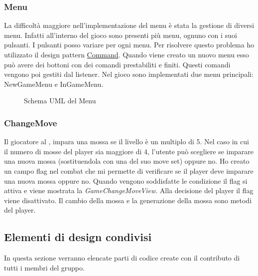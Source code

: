 \documentclass[a4paper,12pt]{report}
\begin{document}
\subsubsection{Menu}
La difficoltà maggiore nell'implementazione del menu è stata la gestione di diversi menu. Infatti all'interno del gioco sono presenti più menu, ognuno con i suoi pulsanti. I pulsanti posso variare per ogni menu. Per risolvere questo problema ho utilizzato il design pattern \href{https://refactoring.guru/design-patterns/command}{Command}. Quando viene creato un nuovo menu esso può avere dei bottoni con dei comandi prestabiliti e finiti. Questi comandi vengono poi gestiti dal listener.
Nel gioco sono implementati due menu principali: NewGameMenu e InGameMenu.
\begin{figure}[H]
	\centering
	
	\caption{Schema UML del Menu}
	\label{fig:the-exiled-menu-uml}
\end{figure}

\subsubsection{ChangeMove}
Il giocatore al \textit{}, impara una mossa se il livello è un multiplo di 5. Nel caso in cui il numero di mosse del player sia maggiore di 4, l'utente può scegliere se imparare una nuova mossa (sostituendola con una del suo move set) oppure no. Ho creato un campo flag nel combat che mi permette di verificare se il player deve imparare una nuova mossa oppure no. Quando vengono soddisfatte le condizione il flag si attiva e viene mostrata la \textit{GameChangeMoveView}. Alla decisione del player il flag viene disattivato. Il cambio della mossa e la generazione della mossa sono metodi del player.

\subsection{Elementi di design condivisi}
In questa sezione verranno elencate parti di codice create con il contributo di tutti i membri del gruppo.
\end{document}
